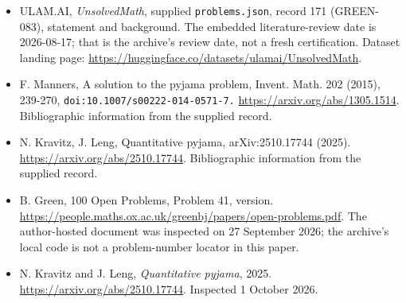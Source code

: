 \documentclass[11pt,a4paper]{article}
\begin{document}
{\small

\begin{itemize}

\item[\hypertarget{source:171:1}{S1}] ULAM.AI, \emph{UnsolvedMath}, supplied \texttt{problems.json}, record 171 (GREEN-083), statement and background. The embedded literature-review date is 2026-08-17; that is the archive’s review date, not a fresh certification. Dataset landing page: \url{https://huggingface.co/datasets/ulamai/UnsolvedMath}.

\item[\hypertarget{source:171:2}{S2}] F. Manners, A solution to the pyjama problem, Invent. Math. 202 (2015), 239-270, \nolinkurl{doi:10.1007/s00222-014-0571-7.} \url{https://arxiv.org/abs/1305.1514}. Bibliographic information from the supplied record.

\item[\hypertarget{source:171:3}{S3}] N. Kravitz, J. Leng, Quantitative pyjama, arXiv:2510.17744 (2025). \url{https://arxiv.org/abs/2510.17744}. Bibliographic information from the supplied record.

\item[\hypertarget{source:171:4}{S4}] B. Green, 100 Open Problems, Problem 41, version. \url{https://people.maths.ox.ac.uk/greenbj/papers/open-problems.pdf}. The author-hosted document was inspected on 27 September 2026; the archive’s local code is not a problem-number locator in this paper.

\item[E1] N. Kravitz and J. Leng, \emph{Quantitative pyjama}, 2025. \url{https://arxiv.org/abs/2510.17744}. Inspected 1 October 2026.

\end{itemize}

}

\label{end:171}
\end{document}
